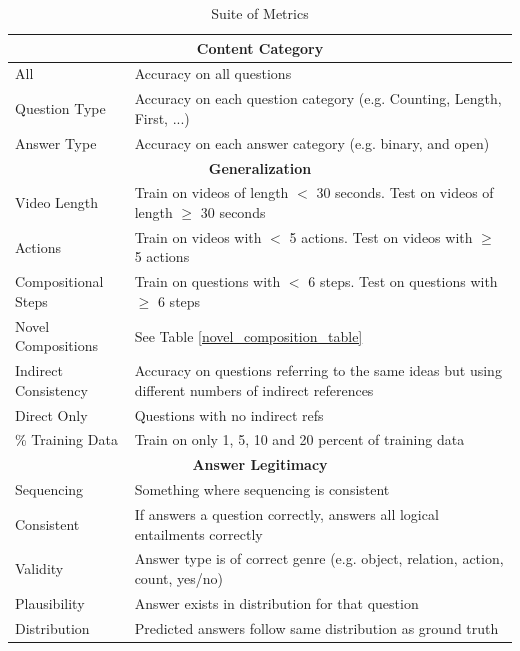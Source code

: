\begin{table}[ht]
    \begin{center}
    \caption{Suite of Metrics}
    \label{metrics}
    \begin{tabular}{|p{2cm}|p{5cm}|}
     \hline
     \multicolumn{2}{|c|}{\textbf{Content Category}}\\
    \hline
    All & Accuracy on all questions\\
    \hline
    Question Type & Accuracy on each question category (e.g. Counting, Length, First, ...)\\
    \hline
    Answer Type & Accuracy on each answer category (e.g. binary, and open)\\
    \hline
    
    
     \multicolumn{2}{|c|}{\textbf{Generalization}}\\
    \hline
    Video Length & Train on videos of length $<$ 30 seconds. Test on videos of length $\geq$ 30 seconds \\
    \hline
    Actions & Train on videos with $<$ 5 actions. Test on videos with $\geq$ 5 actions  \\
    \hline
    Compositional Steps &  Train on questions with $<$ 6 steps. Test on questions with $\geq$ 6 steps  \\
    \hline
    Novel Compositions & See Table \ref{novel_composition_table} \\
    \hline
    Indirect Consistency & Accuracy on questions referring to the same ideas but using different numbers of indirect references\\
    \hline
    Direct Only & Questions with no indirect refs\\
    \hline
    \% Training Data & Train on only 1, 5, 10 and 20 percent of training data \\
    \hline
    
    
     \multicolumn{2}{|c|}{\textbf{Answer Legitimacy}}\\
    \hline
    Sequencing & Something where sequencing is consistent \\
    \hline
    Consistent & If answers a question correctly, answers all logical entailments correctly \\
    \hline
    Validity & Answer type is of correct genre (e.g. object, relation, action, count, yes/no)\\
    \hline
    Plausibility  & Answer exists in distribution for that question\\
    \hline
    Distribution & Predicted answers follow same distribution as ground truth\\
    \hline
    \end{tabular}
    \end{center}
\end{table}


